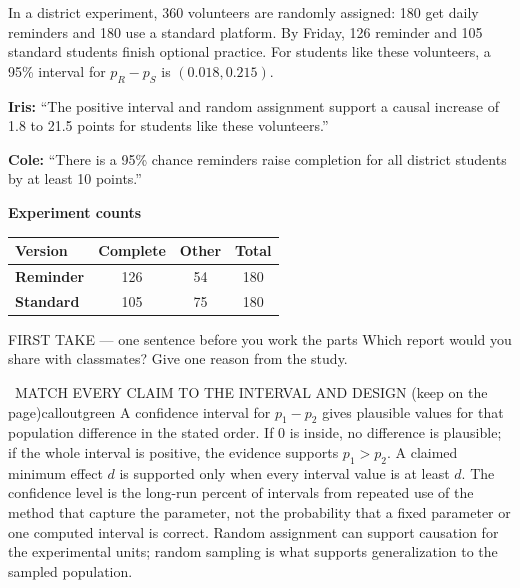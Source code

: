 \documentclass[11pt]{article}
\begin{document}


In a district experiment, 360 volunteers are randomly assigned: 180 get daily reminders and 180 use a standard platform. By Friday, 126 reminder and 105 standard students finish optional practice. For students like these volunteers, a 95\% interval for $p_R-p_S$ is $(0.018,0.215)$.\par\smallskip \textbf{Iris:} ``The positive interval and random assignment support a causal increase of 1.8 to 21.5 points for students like these volunteers.''\par \textbf{Cole:} ``There is a 95\% chance reminders raise completion for all district students by at least 10 points.''\par
\begin{center}
\textbf{Experiment counts}\par\smallskip
\begin{tabular}{|l|c|c|c|}
\hline
\textbf{Version} & \textbf{Complete} & \textbf{Other} & \textbf{Total} \\ \hline
\textbf{Reminder} & 126 & 54 & 180 \\ \hline
\textbf{Standard} & 105 & 75 & 180 \\ \hline
\end{tabular}
\end{center}
\begin{firsttakebox}{FIRST TAKE --- one sentence before you work the parts}
Which report would you share with classmates? Give one reason from the study.
\workspace{0.9in}
\end{firsttakebox}

\begin{callout}{\IconBook\ MATCH EVERY CLAIM TO THE INTERVAL AND DESIGN (keep on the page)}{calloutgreen}
A confidence interval for $p_1-p_2$ gives plausible values for that population difference in the stated order.
If 0 is inside, no difference is plausible; if the whole interval is positive, the evidence supports $p_1>p_2$.
A claimed minimum effect $d$ is supported only when every interval value is at least $d$.
The confidence level is the long-run percent of intervals from repeated use of the method that capture the parameter,
not the probability that a fixed parameter or one computed interval is correct. Random assignment can support causation
for the experimental units; random sampling is what supports generalization to the sampled population.
\end{callout}
\end{document}

